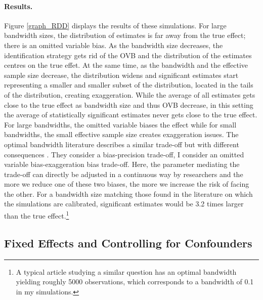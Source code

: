 \documentclass[usletter, 12pt]{article}
\begin{document}
			\paragraph{Results.}  Figure \ref{graph_RDD} displays the results of these simulations.
			For large bandwidth sizes, the distribution of estimates is far away from the true effect; there is an omitted variable bias. As the bandwidth size decreases, the identification strategy gets rid of the OVB and the distribution of the estimates centres on the true effet. At the same time, as the bandwidth and the effective sample size decrease, the distribution widens and significant estimates start representing a smaller and smaller subset of the distribution, located in the tails of the distribution, creating exaggeration. %
			While the average of all estimates gets close to the true effect as bandwidth size and thus OVB decrease, in this setting the average of statistically significant estimates never gets close to the true effect. For large bandwidths, the omitted variable biases the effect while for small bandwidths, the small effective sample size creates exaggeration issues. 
			The optimal bandwidth literature describes a similar trade-off but with different consequences \citep{imbens_optimal_2012}. They consider a bias-precision trade-off, I consider an omitted variable bias-exaggeration bias trade-off. Here, the parameter mediating the trade-off can directly be adjusted in a continuous way by researchers and the more we reduce one of these two biases, the more we increase the risk of facing the other. For a bandwidth size matching those found in the literature on which the simulations are calibrated, significant estimates would be 3.2 times larger than the true effect.\footnote{A typical article studying a similar question has an optimal bandwidth yielding roughly 5000 observations, which corresponds to a bandwidth of 0.1 in my simulations.}
     
		
		 \subsection{Fixed Effects and Controlling for Confounders}\label{sim_ctrl}
		
\end{document}

